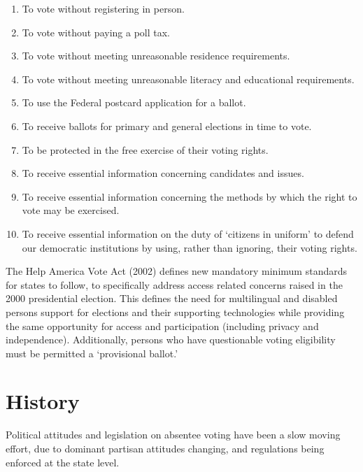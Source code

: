 \begin{enumerate}
  \item To vote without registering in person.
  \item To vote without paying a poll tax.
  \item To vote without meeting unreasonable residence requirements.
  \item To vote without meeting unreasonable literacy and educational requirements.
  \item To use the Federal postcard application for a ballot.
  \item To receive ballots for primary and general elections in time to vote.
  \item To be protected in the free exercise of their voting rights.
  \item To receive essential information concerning candidates and issues.
  \item To receive essential information concerning the methods by which the right to vote may be exercised.
  \item To receive essential information on the duty of `citizens in uniform' to defend our democratic institutions by using, rather than ignoring, their voting rights.
\end{enumerate}

The Help America Vote Act (2002) defines new mandatory minimum standards for states to follow, to specifically address access related concerns raised in the 2000 presidential election. This defines the need for multilingual and disabled persons support for elections and their supporting technologies while providing the same opportunity for access and participation (including privacy and independence). Additionally, persons who have questionable voting eligibility must be permitted a `provisional ballot.' 



\section{History}
Political attitudes and legislation on absentee voting have been a slow moving effort, due to dominant partisan attitudes changing, and regulations being enforced at the state level.

